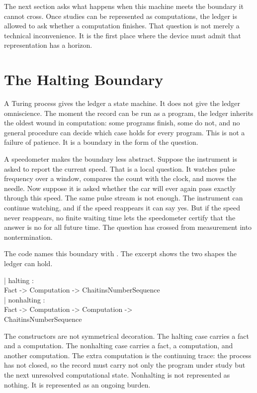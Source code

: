 The next section asks what happens when this machine meets the boundary it
cannot cross. Once studies can be represented as computations, the ledger is
allowed to ask whether a computation finishes. That question is not merely a
technical inconvenience. It is the first place where the device must admit
that representation has a horizon.

\section{The Halting Boundary}
\label{se:halting-boundary}

A Turing process gives the ledger a state machine. It does not give the ledger
omniscience. The moment the record can be run as a program, the ledger inherits
the oldest wound in computation: some programs finish, some do not, and no
general procedure can decide which case holds for every program. This is not a
failure of patience. It is a boundary in the form of the question.

A speedometer makes the boundary less abstract. Suppose the instrument is
asked to report the current speed. That is a local question. It watches pulse
frequency over a window, compares the count with the clock, and moves the
needle. Now suppose it is asked whether the car will ever again pass exactly
through this speed. The same pulse stream is not enough. The instrument can
continue watching, and if the speed reappears it can say yes. But if the speed
never reappears, no finite waiting time lets the speedometer certify that the
answer is no for all future time. The question has crossed from measurement
into nontermination.

The code names this boundary with . The excerpt
shows the two shapes the ledger can hold.

\begin{leancode}
| halting :\\
\quad Fact -> Computation -> ChaitinsNumberSequence\\
| nonhalting :\\
\quad Fact -> Computation -> Computation ->\\
\quad ChaitinsNumberSequence
\end{leancode}

The constructors are not symmetrical decoration. The halting case carries a
fact and a computation. The nonhalting case carries a fact, a computation, and
another computation. The extra computation is the continuing trace: the process
has not closed, so the record must carry not only the program under study but
the next unresolved computational state. Nonhalting is not represented as
nothing. It is represented as an ongoing burden.

